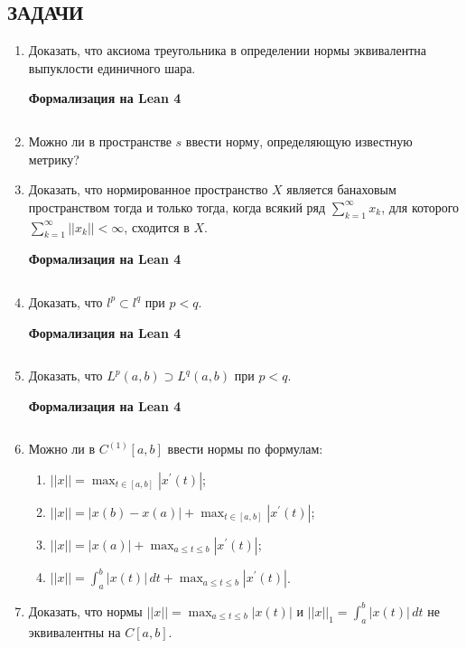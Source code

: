 \documentclass[12pt,a4paper]{article}
\begin{document}
\subsection*{ЗАДАЧИ}
\begin{enumerate}
\newpage
\item Доказать, что аксиома треугольника в определении нормы эквивалентна выпуклости единичного шара.

\begin{center}\small\textbf{Формализация на Lean 4}\end{center}
\inputminted{lean}{FunAn/Section11_NormedSpaces/Task01.lean}

\newpage

\item Можно ли в пространстве $s$ ввести норму, определяющую известную метрику?
\newpage
\item Доказать, что нормированное пространство $X$ является банаховым пространством тогда и только тогда, когда всякий ряд $\sum_{k=1}^{\infty}x_{k}$, для которого $\sum_{k=1}^{\infty}||x_{k}||<\infty$, сходится в $X$.

\begin{center}\small\textbf{Формализация на Lean 4}\end{center}
\inputminted{lean}{FunAn/Section11_NormedSpaces/Task03.lean}

\newpage
\item Доказать, что $l^{p}\subset l^{q}$ при $p<q$.

\begin{center}\small\textbf{Формализация на Lean 4}\end{center}
\inputminted{lean}{FunAn/Section11_NormedSpaces/Task04.lean}

\newpage
\item Доказать, что $L^{p}(a,b)\supset L^{q}(a,b)$ при $p<q$.

\begin{center}\small\textbf{Формализация на Lean 4}\end{center}
\inputminted{lean}{FunAn/Section11_NormedSpaces/Task05.lean}

\newpage

\item Можно ли в $C^{(1)}[a,b]$ ввести нормы по формулам:
\begin{enumerate}[label=\alph*)]
\item $||x||=\max_{t\in[a,b]}|x^{\prime}(t)|$;
\item $||x||=|x(b)-x(a)|+\max_{t\in[a,b]}|x^{\prime}(t)|$;
\item $||x||=|x(a)|+\max_{a\le t\le b}|x^{\prime}(t)|$;
\item $||x||=\int_{a}^{b}|x(t)| \, dt+\max_{a\le t\le b}|x^{\prime}(t)|$.
\end{enumerate}
\newpage
\item Доказать, что нормы $||x||=\max_{a\le t\le b}|x(t)|$ и $||x||_{1}=\int_{a}^{b}|x(t)| \, dt$ не эквивалентны на $C[a,b]$.


\end{enumerate}
\end{document}
